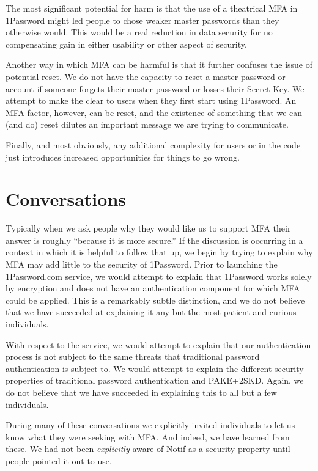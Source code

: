 \documentclass{soups}
\newcommand{\prop}[1]{\textsf{#1}}
\begin{document}
The most significant potential for harm is that the use of a theatrical MFA in 1Password might led people to chose weaker master passwords than they otherwise would. This would be a real reduction in data security for no compensating gain in either usability or other aspect of security.

Another way in which MFA can be harmful is that it further confuses the issue of potential reset. We do not have the capacity to reset a master password or account if someone forgets their master password or losses their Secret Key. We attempt to make the clear to users when they first start using 1Password. An MFA factor, however, can be reset, and the existence of something that we can (and do) reset dilutes an important message we are trying to communicate.

Finally, and most obviously, any additional complexity for users or in the code just introduces increased opportunities for things to go wrong.

\section{Conversations}

Typically
when we ask people why they would like us to support MFA their answer is roughly “because it is more secure.” 
If the discussion is occurring in a context in which it is helpful to follow that up,
we begin by trying to explain why MFA may add little to the security of 1Password.
Prior to launching the 1Password.com service, we would attempt to explain that
1Password works solely by encryption and does not have an authentication component for which MFA could be applied.
This is a remarkably subtle distinction,
and we do not believe that we have succeeded at explaining it any but the
most patient and curious individuals.

With respect to the service, we would attempt to explain that our authentication process is not subject to the same threats that traditional password authentication is subject to.
We would attempt to explain the different security properties of traditional password authentication and PAKE+2SKD.
Again, we do not believe that we have succeeded in explaining this to all but
a few individuals.

During many of these conversations we explicitly invited individuals to let
us know what they were seeking with MFA.\@
And indeed, we have learned from these.
We had not been \emph{explicitly} aware of  \prop{Notif} as a security property
until people pointed it out to use.
\end{document}
